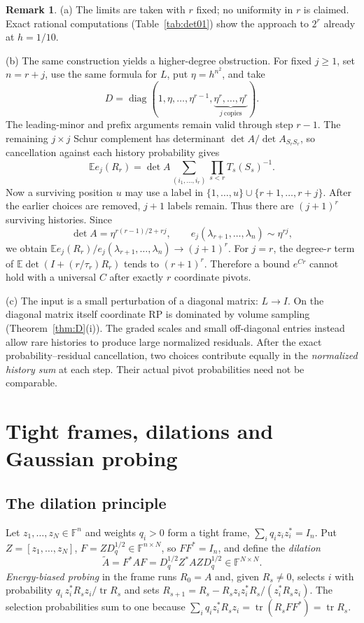 \documentclass[11pt,a4paper]{article}
\theoremstyle{definition}
\newtheorem{remark}[theorem]{Remark}
\newcommand{\E}{\mathbb{E}}
\newcommand{\F}{\mathbb{F}}
\newcommand{\tr}{\operatorname{tr}}
\newcommand{\diag}{\operatorname{diag}}
\begin{document}
\begin{remark}
(a) The limits are taken with $r$ fixed; no uniformity in $r$ is claimed. Exact rational computations (Table~\ref{tab:det01}) show the approach to $2^r$ already at $h=1/10$.

(b) The same construction yields a higher-degree obstruction. For fixed $j\ge1$, set $n=r+j$, use the same formula for $L$, put $\eta=h^{n^2}$, and take
\[
D=\diag(1,\eta,\ldots,\eta^{r-1},
             \underbrace{\eta^r,\ldots,\eta^r}_{j\ \mathrm{copies}}).
\]
The leading-minor and prefix arguments remain valid through step $r-1$. The remaining $j\times j$ Schur complement has determinant $\det A/\det A_{S_rS_r}$, so cancellation against each history probability gives
\[
\E e_j(R_r)=\det A\sum_{(i_1,\ldots,i_r)}
                             \prod_{s<r}T_s(S_s)^{-1}.
\]
Now a surviving position $u$ may use a label in $\{1,\ldots,u\}\cup\{r+1,\ldots,r+j\}$. After the earlier choices are removed, $j+1$ labels remain. Thus there are $(j+1)^r$ surviving histories. Since
\[
\det A=\eta^{r(r-1)/2+rj},\qquad
e_j(\lambda_{r+1},\ldots,\lambda_n)\sim\eta^{rj},
\]
we obtain $\E e_j(R_r)/e_j(\lambda_{r+1},\ldots,\lambda_n)\to(j+1)^r$. For $j=r$, the degree-$r$ term of $\E\det(I+(r/\tau_r)R_r)$ tends to $(r+1)^r$. Therefore a bound $e^{Cr}$ cannot hold with a universal $C$ after exactly $r$ coordinate pivots.

(c) The input is a small perturbation of a diagonal matrix: $L\to I$. On the diagonal matrix itself coordinate RP is dominated by volume sampling (Theorem~\ref{thm:D}(i)). The graded scales and small off-diagonal entries instead allow rare histories to produce large normalized residuals. After the exact probability--residual cancellation, two choices contribute equally in the \emph{normalized history sum} at each step. Their actual pivot probabilities need not be comparable.
\end{remark}
\section{Tight frames, dilations and Gaussian probing}\label{sec:dilation}

\subsection{The dilation principle}
Let $z_1,\dots,z_N\in\F^n$ and weights $q_i>0$ form a tight frame, $\sum_iq_iz_iz_i^*=I_n$. Put $Z=[z_1,\dots,z_N]$, $F=ZD_q^{1/2}\in\F^{n\times N}$, so $FF^*=I_n$, and define the \emph{dilation}
\[
\widetilde A=F^*AF=D_q^{1/2}Z^*AZD_q^{1/2}\in\F^{N\times N}.
\]
\emph{Energy-biased probing} in the frame runs $R_0=A$ and, given $R_s\ne0$, selects $i$ with probability $q_i\,z_i^*R_sz_i/\tr R_s$ and sets $R_{s+1}=R_s-R_sz_iz_i^*R_s/(z_i^*R_sz_i)$. The selection probabilities sum to one because $\sum_iq_iz_i^*R_sz_i=\tr(R_sFF^*)=\tr R_s$.
\end{document}
